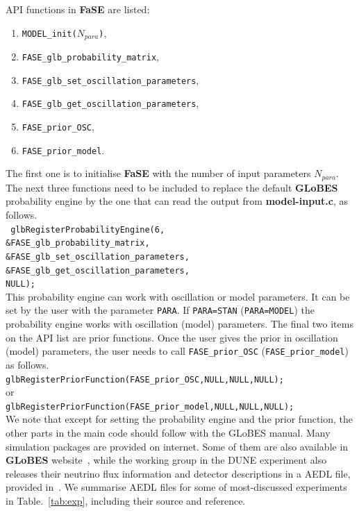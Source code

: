 \documentclass[aps,prd,nofootinbib,preprint]{revtex4}
\begin{document}
API functions in \textbf{FaSE} are listed:
\begin{enumerate}
\item \texttt{MODEL\_init($N_{para}$)},
\item  \texttt{FASE\_glb\_probability\_matrix},
\item  \texttt{FASE\_glb\_set\_oscillation\_parameters},
\item  \texttt{FASE\_glb\_get\_oscillation\_parameters},
\item \texttt{FASE\_prior\_OSC},
\item \texttt{FASE\_prior\_model}.
\end{enumerate}
The first one is to initialise \textbf{FaSE} with the number of input parameters $N_{para}$. The next three functions need to be included to replace the default \textbf{GLoBES} probability engine by the one that can read the output from \textbf{model-input.c}, as follows.\vspace{0.2cm}\\
\texttt{    glbRegisterProbabilityEngine(6,\\
                                 \&FASE\_glb\_probability\_matrix,\\
                                 \&FASE\_glb\_set\_oscillation\_parameters,\\
                                 \&FASE\_glb\_get\_oscillation\_parameters,\\
                                 NULL); }\vspace{0.2cm}\\ 
This probability engine can work with oscillation or model parameters. It can be set by the user with the parameter \texttt{PARA}. If \texttt{PARA=STAN} (\texttt{PARA=MODEL}) the probability engine works with oscillation (model) parameters. The final two items on the API list are prior functions. Once the user gives the prior in oscillation (model) parameters, the user needs to call \texttt{FASE\_prior\_OSC} (\texttt{FASE\_prior\_model}) as follows.\vspace{0.2cm}\\
\texttt{glbRegisterPriorFunction(FASE\_prior\_OSC,NULL,NULL,NULL); }  \\
or\\
\texttt{glbRegisterPriorFunction(FASE\_prior\_model,NULL,NULL,NULL); } \vspace{0.2cm}\\
We note that except for setting the probability engine and the prior function, the other parts in the main code should follow with the GLoBES manual. 
%
%
{\color{blue}Many simulation packages are provided on internet. Some of them are also available in \textbf{GLoBES} website~\cite{GLoBES}, while the working group in the DUNE experiment also releases their neutrino flux information and detector descriptions in a AEDL file, provided in~\cite{Alion:2016uaj}. We summarise AEDL files for some of most-discussed experiments in Table.~\ref{tab:exp}, including their source and reference.}
\end{document}
